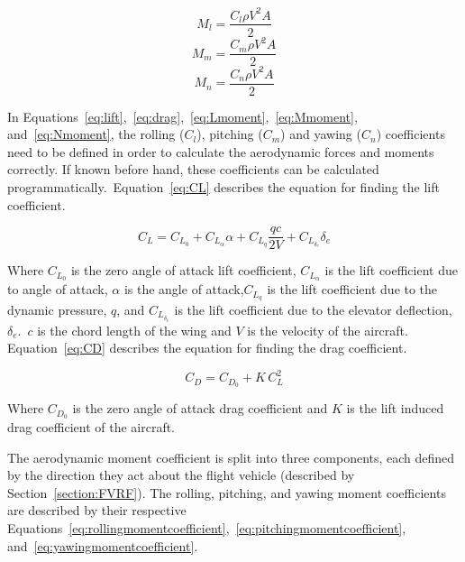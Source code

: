 \begin{equation}\label{eq:Lmoment}
    M_l = \frac{C_l \rho V^2 A}{2}
\end{equation}
\begin{equation}\label{eq:Mmoment}
    M_m = \frac{C_m \rho V^2 A}{2}
\end{equation}
\begin{equation}\label{eq:Nmoment}
    M_n = \frac{C_n \rho V^2 A}{2}
\end{equation}

In Equations~\ref{eq:lift},~\ref{eq:drag},~\ref{eq:Lmoment},~\ref{eq:Mmoment}, and~\ref{eq:Nmoment}, the rolling (\(C_l\)), pitching (\(C_m\)) and yawing (\(C_n\)) coefficients need to be defined in order to calculate the aerodynamic forces and moments correctly. If known before hand, these coefficients can be calculated programmatically.~Equation~\ref{eq:CL} describes the equation for finding the lift coefficient.

\begin{equation}\label{eq:CL}
    C_L = C_{L_0} + C_{L_\alpha}\alpha + C_{L_q}\frac{qc}{2V} + C_{L_{\delta_e}}\delta_e
\end{equation}

Where \(C_{L_0}\) is the zero angle of attack lift coefficient, \(C_{L_\alpha}\) is the lift coefficient due to angle of attack, \(\alpha \) is the angle of attack,\(C_{L_q}\) is the lift coefficient due to the dynamic pressure, \(q\), and \(C_{L_{\delta_e}}\) is the lift coefficient due to the elevator deflection, \(\delta_e\).~\(c\) is the chord length of the wing and \(V\) is the velocity of the aircraft. Equation~\ref{eq:CD} describes the equation for finding the drag coefficient.

\begin{equation}\label{eq:CD}
    C_D = C_{D_0} + K\,C_{L}^2
\end{equation}

Where \(C_{D_0}\) is the zero angle of attack drag coefficient and \(K\) is the lift induced drag coefficient of the aircraft.

The aerodynamic moment coefficient is split into three components, each defined by the direction they act about the flight vehicle (described by Section~\ref{section:FVRF}). The rolling, pitching, and yawing moment coefficients are described by their respective Equations~\ref{eq:rollingmomentcoefficient},~\ref{eq:pitchingmomentcoefficient}, and~\ref{eq:yawingmomentcoefficient}.

